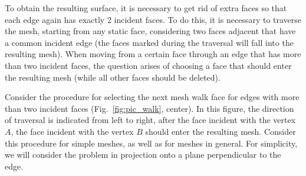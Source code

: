 \documentclass[
11pt,%
tightenlines,%
twoside,%
onecolumn,%
nofloats,%
nobibnotes,%
nofootinbib,%
superscriptaddress,%
noshowpacs,%
centertags]%
{revtex4-2}
\begin{document}
To obtain the resulting surface, it is necessary to get rid of extra faces so that each edge again has exactly 2 incident faces.
To do this, it is necessary to traverse the mesh, starting from any static face, considering two faces adjacent that have a common incident edge (the faces marked during the traversal will fall into the resulting mesh).
When moving from a certain face through an edge that has more than two incident faces, the question arises of choosing a face that should enter the resulting mesh (while all other faces should be deleted).

Consider the procedure for selecting the next mesh walk face for edges with more than two incident faces (Fig.~\ref{fig:pic_walk}, center).
In this figure, the direction of traversal is indicated from left to right, after the face incident with the vertex $A$, the face incident with the vertex $B$ should enter the resulting mesh.
Consider this procedure for simple meshes, as well as for meshes in general.
For simplicity, we will consider the problem in projection onto a plane perpendicular to the edge.
\end{document}

